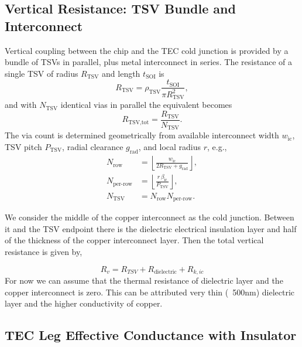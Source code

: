 \documentclass[conference]{IEEEtran}
\begin{document}
\subsection{Vertical Resistance: TSV Bundle and Interconnect}

Vertical coupling between the chip and the TEC cold junction is provided by a bundle of TSVs in parallel, plus metal interconnect in series. The resistance of a single TSV of radius $R_{\text{TSV}}$ and length $t_{\text{SOI}}$ is
\begin{equation}
	R_{\text{TSV}} = \rho_{\text{TSV}} \frac{t_{\text{SOI}}}{\pi R_{\text{TSV}}^2},
	\label{eq:R_tsv_single}
\end{equation}
and with $N_{\text{TSV}}$ identical vias in parallel the equivalent becomes
\begin{equation}
	R_{\text{TSV,tot}} = \frac{R_{\text{TSV}}}{N_{\text{TSV}}}.
	\label{eq:R_tsv_tot}
\end{equation}
The via count is determined geometrically from available interconnect width $w_{\text{ic}}$, TSV pitch $P_{\text{TSV}}$, radial clearance $g_{\text{rad}}$, and local radius $r$, e.g.,
\begin{align}
	N_{\text{row}} &= \left\lfloor \frac{w_{\text{ic}}}{2 R_{\text{TSV}} + g_{\text{rad}}} \right\rfloor, \\
	N_{\text{per-row}} &= \left\lfloor \frac{r \, \beta_{\text{ic}}}{P_{\text{TSV}}} \right\rfloor, \\
	N_{\text{TSV}} &= N_{\text{row}} N_{\text{per-row}}.
	\label{eq:N_tsv}
\end{align}

We consider the middle of the copper interconnect as the cold junction. Between it and the TSV endpoint there is the dielectric electrical insulation layer and half of the thickness of the copper interconnect layer. Then the total vertical resistance is given by,

\begin{equation}
	R_v=R_{TSV}+R_{\mathrm{dielectric}}+R_{k,ic}
	\label{eq:R_v_def}
\end{equation}
For now we can assume that the thermal resistance of dielectric layer and the copper interconnect is zero. This can be attributed very thin (~500nm) dielectric layer and the higher conductivity of copper.

\subsection{TEC Leg Effective Conductance with Insulator}
\end{document}
